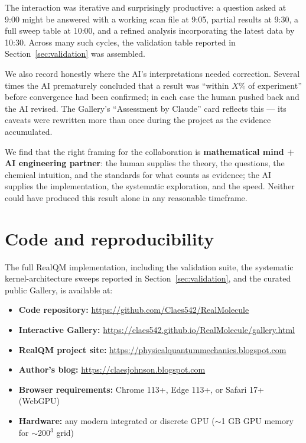 \documentclass[11pt]{article}
\begin{document}
The interaction was iterative and surprisingly productive: a question asked at 9:00 might be answered with a working scan file at 9:05, partial results at 9:30, a full sweep table at 10:00, and a refined analysis incorporating the latest data by 10:30. Across many such cycles, the validation table reported in Section~\ref{sec:validation} was assembled.

We also record honestly where the AI's interpretations needed correction. Several times the AI prematurely concluded that a result was ``within $X\%$ of experiment'' before convergence had been confirmed; in each case the human pushed back and the AI revised. The Gallery's ``Assessment by Claude'' card reflects this --- its caveats were rewritten more than once during the project as the evidence accumulated.

We find that the right framing for the collaboration is \textbf{mathematical mind + AI engineering partner}: the human supplies the theory, the questions, the chemical intuition, and the standards for what counts as evidence; the AI supplies the implementation, the systematic exploration, and the speed. Neither could have produced this result alone in any reasonable timeframe.

\section{Code and reproducibility}\label{sec:code}

The full RealQM implementation, including the validation suite, the systematic kernel-architecture sweeps reported in Section~\ref{sec:validation}, and the curated public Gallery, is available at:

\begin{itemize}
\item \textbf{Code repository:} \url{https://github.com/Claes542/RealMolecule}
\item \textbf{Interactive Gallery:} \url{https://claes542.github.io/RealMolecule/gallery.html}
\item \textbf{RealQM project site:} \url{https://physicalquantummechanics.blogspot.com}
\item \textbf{Author's blog:} \url{https://claesjohnson.blogspot.com}
\item \textbf{Browser requirements:} Chrome 113+, Edge 113+, or Safari 17+ (WebGPU)
\item \textbf{Hardware:} any modern integrated or discrete GPU ($\sim$1 GB GPU memory for $\sim$200$^3$ grid)
\end{itemize}
\end{document}
